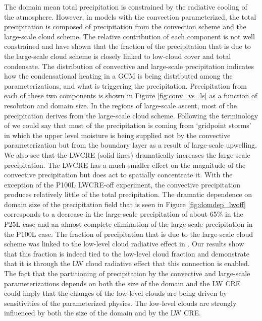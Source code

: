 \documentclass[draft]{agujournal2019}
\begin{document}
{The domain mean total precipitation is constrained by the radiative cooling of the atmosphere.  
However, in models with the convection parameterized, the 
total precipitation is composed of precipitation from the convection scheme and the large-scale cloud scheme. 
The relative contribution of each component is not well constrained and  have shown 
that the fraction of the precipitation that is due to the large-scale cloud scheme is closely linked 
to low-cloud cover and total condensate.  
The distribution of convective and large-scale precipitation indicates how the condensational heating
in a GCM is being distributed among the parameterizations, and what is triggering the precipitation.  
Precipitation from each of these two components is shown in Figure \ref{fig:conv_vs_ls} as a function of 
resolution and domain size.  In the regions of large-scale ascent, most of the precipitation derives 
from the large-scale cloud scheme.  Following the terminology of  we could say that most 
of the precipitation is coming from `gridpoint storms' in which the upper level moisture is being supplied not 
by the convective parameterization but from the boundary layer as a result of large-scale upwelling.
We also see that the LWCRE (solid lines) dramatically increases the large-scale precipitation.  
The LWCRE has a much smaller effect on the magnitude of the convective precipitation but does act to spatially concentrate it.  
With the exception of the P100L LWCRE-off experiment, the convective precipitation produces relatively little of the total precipitation.  
The dramatic dependence on domain size of the precipitation field that is 
seen in Figure \ref{fig:domdep_lwoff} corresponds to a decrease in the large-scale precipitation of about 65\% in the P25L case
and an almost complete elimination of the large-scale precipitation in the P100L case.    
The fraction of precipitation that is due to the large-scale cloud scheme was linked to the low-level cloud radiative
effect in . Our results show that this fraction is indeed tied to the low-level cloud fraction 
and demonstrate that it is through the LW cloud radiative effect that this connection is enabled.
The fact that the partitioning of precipitation by the convective and large-scale 
parameterizations depends on both the size of the domain and the LW CRE 
could imply that the changes of the low-level clouds are being driven by 
sensitivities of the parameterized physics.   
The low-level clouds are strongly influenced by both the size of the domain and by the LW CRE. 


}
\end{document}
